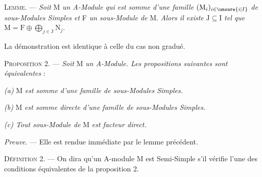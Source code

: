 \textsc{Lemme}. — \emph{Soit} M \emph{un A-Module qui est somme d'une famille}
$(\mathrm M_i)_{i\in\unsure{i|I}}$ \emph{de sous-Modules
Simples et} F \emph{un sous-Module de} M. \emph{Alors il existe}
$\mathrm J\subseteq\mathrm I$ \emph{tel que}
$\mathrm M=\mathrm F\oplus\bigoplus_{j\in\mathrm J}\mathrm N_j$.

La démonstration est identique à celle du cas non gradué.

\textsc{Proposition 2}. — \emph{Soit} M \emph{un A-Module. Les propositions suivantes sont équivalentes} :

\emph{(a)} M \emph{est somme d'une famille de sous-Modules Simples.}

\emph{(b)} M \emph{est somme directe d'une famille de sous-Modules Simples.}

\emph{(c) Tout sous-Module de} M \emph{est facteur direct.}

\emph{Preuve}. — Elle est rendue immédiate par le lemme précédent.

\textsc{Définition 2}. — On dira qu'un A-module M est Semi-Simple s'il vérifie l'une des conditions
équivalentes de la proposition 2.

